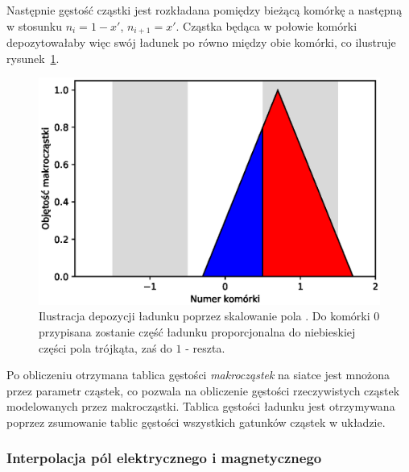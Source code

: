 Następnie gęstość cząstki jest rozkładana pomiędzy bieżącą komórkę a
następną w stosunku $n_i = 1-x'$, $n_{i+1} = x'$. Cząstka będąca
w połowie komórki depozytowałaby więc swój ładunek po równo między obie
komórki, co ilustruje rysunek~\ref{fig:charge-deposition}.


\begin{figure}[h!]
  \includegraphics[width=\textwidth]{Images/charge-deposition}
  \caption{Ilustracja depozycji ładunku poprzez skalowanie pola . Do komórki $0$ przypisana zostanie część ładunku proporcjonalna do
niebieskiej części pola trójkąta, zaś do $1$ - reszta.\label{fig:charge-deposition}}
\end{figure} %

Po obliczeniu otrzymana tablica gęstości \emph{makrocząstek} na
siatce jest mnożona przez parametr  cząstek, co pozwala na
obliczenie gęstości rzeczywistych cząstek modelowanych przez makrocząstki.
Tablica gęstości ładunku jest otrzymywana poprzez zsumowanie tablic gęstości
wszystkich gatunków cząstek w układzie.

\subsubsection{Interpolacja pól elektrycznego i magnetycznego}

